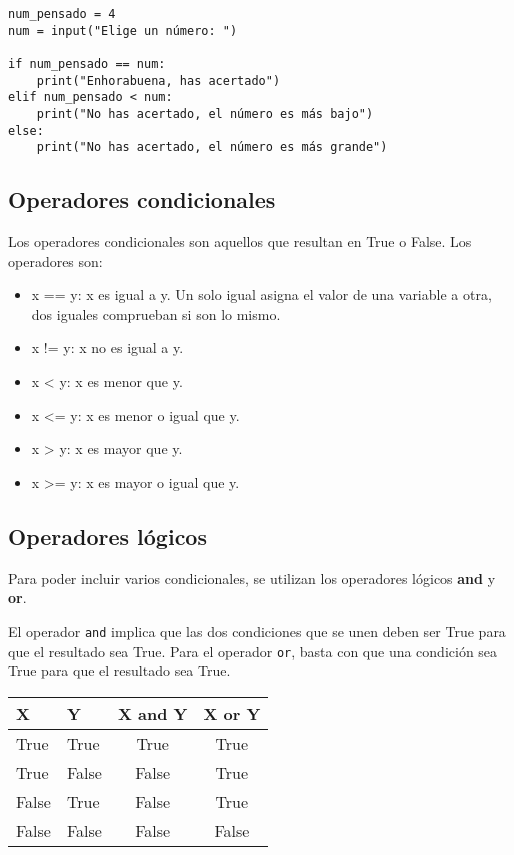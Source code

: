 \begin{lstlisting}
num_pensado = 4
num = input("Elige un número: ")

if num_pensado == num:
	print("Enhorabuena, has acertado")
elif num_pensado < num:
	print("No has acertado, el número es más bajo")
else:
	print("No has acertado, el número es más grande")
\end{lstlisting}

\subsection{Operadores condicionales}
Los operadores condicionales son aquellos que resultan en True o False. Los operadores son:
\begin{itemize}
\item x == y: x es igual a y. Un solo igual asigna el valor de una variable a otra, dos iguales comprueban si son lo mismo.
\item x != y: x no es igual a y.
\item x < y: x es menor que y.
\item x <= y: x es menor o igual que y.
\item x > y: x es mayor que y.
\item x >= y: x es mayor o igual que y. 
\end{itemize}

\subsection{Operadores lógicos}
Para poder incluir varios condicionales, se utilizan los operadores lógicos \textbf{and} y \textbf{or}. 

El operador \texttt{and} implica que las dos condiciones que se unen deben ser True para que el resultado sea True. Para el operador \texttt{or}, basta con que una condición sea True para que el resultado sea True.

\begin{table}[htbp]
	\centering
	\begin{tabularx}{0.5\textwidth}{XXcc}
	X & Y & X and Y & X or Y \\ \hline
	True & True & True & True \\
	True & False & False & True \\
	False & True & False & True \\
	False & False & False & False
	\end{tabularx}
\end{table}

